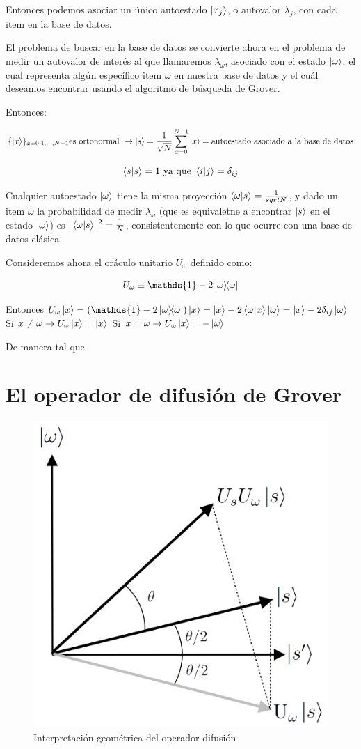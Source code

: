 \documentclass[11pt, spanish]{report}
\begin{document}
Entonces podemos asociar un único autoestado $\ket{x_j}$, o autovalor
$\lambda_j$, con cada item en la base de datos.

El problema de buscar en la base de datos se convierte ahora en el problema de
medir un autovalor de interés al que llamaremos $\lambda_\omega$, asociado con
el estado $\ket{\omega}$, el cual representa algún específico item $\omega$ en
nuestra base de datos y el cuál deseamos encontrar usando el algoritmo de
búsqueda de Grover.

Entonces:

$$\{\ket{x}\}_{x=0,1,...,N-1} \text{es ortonormal }\rightarrow \ket{s} =
\frac{1}{\sqrt{N}} \sum\limits_{x=0}^{N-1} \ket{x} = \text{autoestado asociado a
  la base de datos}$$

$$\braket{s}{s} = 1 \text{ ya que } \braket{i}{j} = \delta_{ij}$$

Cualquier autoestado $\ket{\omega}$ tiene la misma proyección
$\braket{\omega}{s} = \frac{1}{sqrt{N}}$, y dado un item $\omega$ la
probabilidad de medir $\lambda_\omega$ (que es equivaletne a encontrar $\ket{s}$
en el estado $\ket{\omega}$) es $|\braket{\omega}{s}|^2 = \frac{1}{N}$,
consistentemente con lo que ocurre con una base de datos clásica.

Consideremos ahora el oráculo unitario $U_\omega$ definido como:

$$U_\omega \equiv \mathds{1} - 2\ketbra{\omega}{\omega}$$

Entonces $U_\omega \ket{x} = (\mathds{1} - 2\ketbra{\omega}{\omega}) \ket{x} =
\ket{x} - 2 \braket{\omega}{x} \ket{\omega} = \ket{x} - 2 \delta_{ij} \ket{\omega}$
 Si $x \neq \omega \rightarrow U_\omega \ket{x} = \ket{x}$ 
 Si $x = \omega \rightarrow U_\omega \ket{x} = -\ket{\omega}$ 

 De manera tal que

\section{El operador de difusión de Grover}

\begin{figure}[H]
\centering \includegraphics[width=0.3\linewidth]{Grover/grover_geometry.png}
\caption{Interpretación geométrica del operador difusión}
\end{figure}
\end{document}
